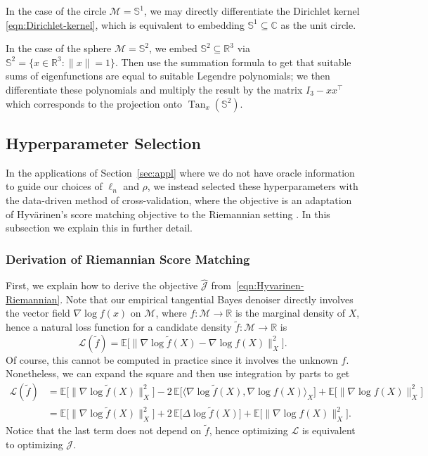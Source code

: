 \documentclass[preprint]{imsart}
\theoremstyle{plain}
\theoremstyle{definition}
\newcommand{\Rbb}{\mathbb{R}}
\newcommand{\Cbb}{\mathbb{C}}
\newcommand{\Mcal}{\mathcal{M}}
\DeclareMathOperator{\Tan}{Tan}
\begin{document}
\begin{appendix}
In the case of the circle $\Mcal=\mathbb{S}^1$, we may directly differentiate the Dirichlet kernel \eqref{eqn:Dirichlet-kernel}, which is equivalent to embedding $\mathbb{S}^1\subseteq\Cbb$ as the unit circle.

In the case of the sphere $\Mcal=\mathbb{S}^2$, we embed $\mathbb{S}^2\subseteq\Rbb^3$ via $\mathbb{S}^2=\{x\in\Rbb^3:\|x\|=1\}$.
Then use the summation formula to get that suitable sums of eigenfunctions are equal to suitable Legendre polynomials; we then differentiate these polynomials and multiply the result by the matrix $I_3-xx^{\top}$ which corresponds to the projection onto $\Tan_x(\mathbb{S}^2)$.

\subsection{Hyperparameter Selection}\label{subsec:score-matching}

In the applications of Section~\ref{sec:appl} where we do not have oracle information to guide our choices of $\ell_n$ and $\rho$, we instead selected these hyperparameters with the data-driven method of cross-validation, where the objective is an adaptation of Hyv\"arinen's score matching objective \cite{hyvarinen2005} to the Riemannian setting \cite{de2022riemannian}.
In this subsection we explain this in further detail.

\subsubsection{Derivation of Riemannian Score Matching}

First, we explain how to derive the objective $\hat{\mathcal{J}}$ from~\eqref{eqn:Hyvarinen-Riemannian}.
Note that our empirical tangential Bayes denoiser directly involves the vector field $\nabla \log f(x)$ on $\Mcal$, where $f:\Mcal\to\Rbb$ is the marginal density of $X$, hence a natural loss function for a candidate density $\tilde f:\Mcal\to\Rbb$ is
\begin{equation}
\mathcal{L}(\tilde f)
=
\mathbb{E}\big[
\|\nabla \log \tilde{f}(X) - \nabla \log f(X)\|_X^2
\big].
\end{equation}
Of course, this cannot be computed in practice since it involves the unknown $f$.
Nonetheless, we can expand the square and then use integration by parts to get
\begin{align*}
    \mathcal{L}(\tilde{f}) &= \mathbb{E}\big[\|\nabla \log \tilde f (X)\|_X^2\big] - 2\,\mathbb{E}\big[\langle \nabla \log \tilde f(X), \nabla \log f(X)\rangle_X\big] + \mathbb{E}\big[\|\nabla \log f (X)\|_X^2\big] \\
    &= \mathbb{E}\big[\|\nabla \log \tilde f (X)\|_X^2\big] + 2\,\mathbb{E}\big[\Delta \log \tilde{f}(X)\big] + \mathbb{E}\big[\|\nabla \log f (X)\|_X^2\big].
\end{align*}
Notice that the last term does not depend on $\tilde{f}$, hence optimizing $\mathcal{L}$ is equivalent to optimizing $\mathcal{J}$.


\end{appendix}
\end{document}
